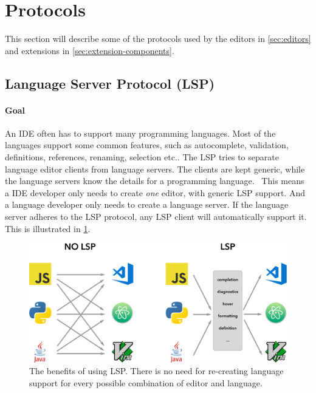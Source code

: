 \section{Protocols}\label{sec:protocols}

This section will describe some of the protocols used by the editors in \cref{sec:editors} and extensions in \cref{sec:extension-components}.

\subsection{Language Server Protocol (LSP)}\label{sec:lsp}

\paragraph*{Goal} An \gls{IDE} often has to support many programming languages.
Most of the languages support some common features, such as autocomplete,  validation, definitions, references, renaming, selection etc..
The \gls{LSP} tries to separate language editor clients from language servers.
The clients are kept generic, while the language servers know the details for a programming language.~\cite{microsoftOverview}
This means a \gls{IDE} developer only needs to create \textit{one} editor, with generic \gls{LSP} support.
And a language developer only needs to create a language server.
If the language server adheres to the \gls{LSP} protocol, any \gls{LSP} client will automatically support it.
This is illustrated in \cref{fig:lsp-benefits}.

\begin{figure}[htbp]  %
  \centering
  \includegraphics[width=\textwidth]{figures/lsp-languages-editors}
  \caption[LSP Benefits]{The benefits of using \gls{LSP}. There is no need for re-creating language support for every possible combination of editor and language.~\cite{microsoftLanguageServerExtension2020}}\label{fig:lsp-benefits}
\end{figure}


